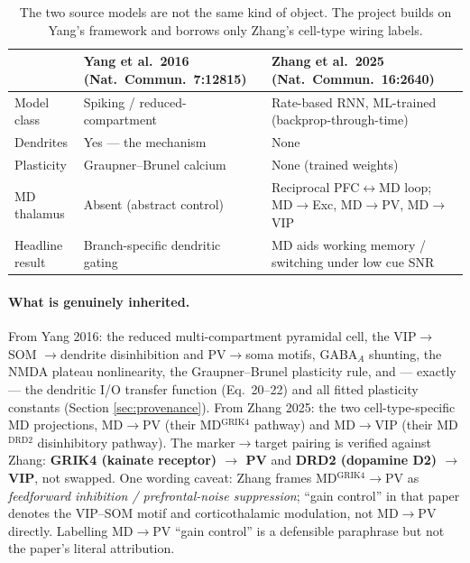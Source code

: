 \documentclass[11pt,a4paper]{article}
\begin{document}
\begin{table}[H]
    \centering
    \small
    \begin{tabular}{@{}lp{5.0cm}p{5.0cm}@{}}
    \toprule
     & \textbf{Yang et al.\ 2016} (Nat.\ Commun.\ 7:12815) & \textbf{Zhang et al.\ 2025} (Nat.\ Commun.\ 16:2640) \\ \midrule
    Model class      & Spiking / reduced-compartment & Rate-based RNN, ML-trained (backprop-through-time) \\
    Dendrites        & Yes --- the mechanism         & None \\
    Plasticity       & Graupner--Brunel calcium      & None (trained weights) \\
    MD thalamus      & Absent (abstract control)     & Reciprocal PFC$\leftrightarrow$MD loop; MD$\rightarrow$Exc, MD$\rightarrow$PV, MD$\rightarrow$VIP \\
    Headline result  & Branch-specific dendritic gating & MD aids working memory / switching under low cue SNR \\ \bottomrule
    \end{tabular}
    \caption{The two source models are not the same kind of object. The project builds on
    Yang's framework and borrows only Zhang's cell-type wiring labels.}
    \label{tab:papers}
\end{table}

\paragraph{What is genuinely inherited.}
From Yang 2016: the reduced multi-compartment pyramidal cell, the VIP$\rightarrow$SOM
$\rightarrow$dendrite disinhibition and PV$\rightarrow$soma motifs, GABA$_A$ shunting,
the NMDA plateau nonlinearity, the Graupner--Brunel plasticity rule, and --- exactly ---
the dendritic I/O transfer function (Eq.~20--22) and all fitted plasticity constants
(Section \ref{sec:provenance}). From Zhang 2025: the two cell-type-specific MD
projections, MD$\rightarrow$PV (their MD$^{\text{GRIK4}}$ pathway) and MD$\rightarrow$VIP
(their MD$^{\text{DRD2}}$ disinhibitory pathway). The marker$\rightarrow$target pairing is
verified against Zhang: \textbf{GRIK4 (kainate receptor) $\rightarrow$ PV} and
\textbf{DRD2 (dopamine D2) $\rightarrow$ VIP}, not swapped. One wording caveat: Zhang
frames MD$^{\text{GRIK4}}\rightarrow$PV as \emph{feedforward inhibition / prefrontal-noise
suppression}; ``gain control'' in that paper denotes the VIP--SOM motif and corticothalamic
modulation, not MD$\rightarrow$PV directly. Labelling MD$\rightarrow$PV ``gain control'' is
a defensible paraphrase but not the paper's literal attribution.
\end{document}
